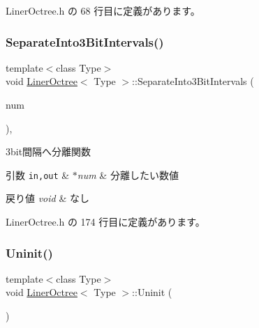  Liner\+Octree.\+h の 68 行目に定義があります。

\mbox{\label{class_liner_octree_acfa567ec0f969684f55443fc9ee98432}} 
\subsubsection{\texorpdfstring{Separate\+Into3\+Bit\+Intervals()}{SeparateInto3BitIntervals()}}
{\footnotesize\ttfamily template$<$class Type$>$ \\
void \mbox{\hyperlink{class_liner_octree}{Liner\+Octree}}$<$ Type $>$\+::Separate\+Into3\+Bit\+Intervals (\begin{DoxyParamCaption}\item[{D\+W\+O\+RD $\ast$}]{num }\end{DoxyParamCaption})\hspace{0.3cm}{\ttfamily [inline]}, {\ttfamily [private]}}



3bit間隔へ分離関数 


\begin{DoxyParams}[1]{引数}
\mbox{\tt in,out}  & {\em $\ast$num} & 分離したい数値 \\
\hline
\end{DoxyParams}

\begin{DoxyRetVals}{戻り値}
{\em void} & なし \\
\hline
\end{DoxyRetVals}


 Liner\+Octree.\+h の 174 行目に定義があります。

\mbox{\label{class_liner_octree_a86b5b9bc86630644e84508ff385cda69}} 
\subsubsection{\texorpdfstring{Uninit()}{Uninit()}}
{\footnotesize\ttfamily template$<$class Type$>$ \\
void \mbox{\hyperlink{class_liner_octree}{Liner\+Octree}}$<$ Type $>$\+::Uninit (\begin{DoxyParamCaption}{ }\end{DoxyParamCaption})\hspace{0.3cm}{\ttfamily [inline]}}




